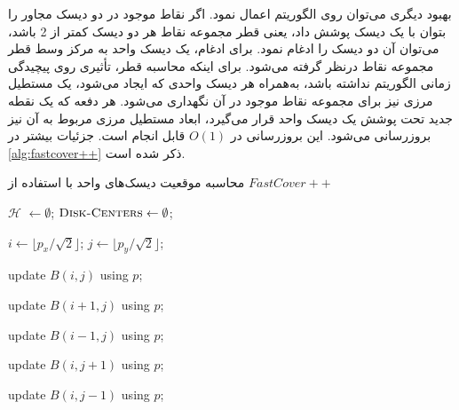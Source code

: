 \documentclass[12pt]{article}
\begin{document}
بهبود دیگری می‌توان روی الگوریتم اعمال نمود. اگر نقاط موجود در دو دیسک مجاور را بتوان با یک دیسک پوشش داد، یعنی قطر مجموعه نقاط هر دو دیسک کمتر از 2 باشد، می‌توان آن دو دیسک را ادغام نمود. برای ادغام، یک دیسک واحد به مرکز وسط قطر مجموعه نقاط درنظر گرفته می‌شود. برای اینکه محاسبه قطر، تأثیری روی پیچیدگی زمانی الگوریتم نداشته باشد، به‌همراه هر دیسک واحدی که ایجاد می‌شود، یک مستطیل مرزی نیز برای مجموعه نقاط موجود در آن نگهداری می‌شود. هر دفعه که یک نقطه جدید تحت پوشش یک دیسک واحد قرار می‌گیرد، ابعاد مستطیل مرزی مربوط به آن نیز بروزرسانی می‌شود. این بروزرسانی در $O(1)$ قابل انجام است. جزئیات بیشتر در
\cref{alg:fastcover++}
ذکر شده است.


\begin{algorithm}[H]
\singlespacing
\caption{
محاسبه موقعیت دیسک‌های واحد با استفاده از $FastCover++$
} 
\label{alg:fastcover++} 
\begin{latin}
	\begin{algorithmic}[1] 
		\STATE \texttt{$\mathcal{H}$} $\leftarrow \emptyset$;
						 $\textsc{Disk-Centers} \leftarrow \emptyset$;

		\STATE  $i\leftarrow \lfloor p_x/\sqrt{2}\rfloor$;  $j\leftarrow \lfloor p_y/\sqrt{2}\rfloor$;
		
		\STATE update $B(i,j)$ using $p$; 
		
		\STATE update $B(i+1,j)$ using $p$; 
		
		\STATE  update $B(i-1,j)$ using $p$; 
		
		\STATE   update $B(i,j+1)$ using $p$; 
		
		\STATE   update $B(i,j-1)$ using $p$; 
		

\end{algorithmic}
\end{latin}
\end{algorithm}
\end{document}
